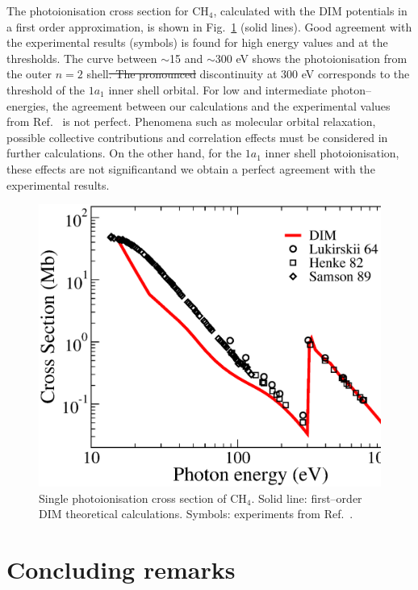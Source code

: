 \documentclass[10pt]{article}
\providecommand{\DIFaddtex}[1]{{\protect\color{blue}\uwave{#1}}} %
\providecommand{\DIFdeltex}[1]{{\protect\color{red}\sout{#1}}}                      %
\providecommand{\DIFaddbegin}{} %
\providecommand{\DIFaddend}{} %
\providecommand{\DIFdelbegin}{} %
\providecommand{\DIFdelend}{} %
\providecommand{\DIFadd}[1]{\texorpdfstring{\DIFaddtex{#1}}{#1}} %
\providecommand{\DIFdel}[1]{\texorpdfstring{\DIFdeltex{#1}}{}} %
\newcommand{\DIFscaledelfig}{0.5}
\newlength{\DIFdelgraphicswidth} %
\newlength{\DIFdelgraphicsheight} %
\newcommand{\DIFaddincludegraphics}[2][]{{\color{blue}\fbox{\DIFOincludegraphics[#1]{#2}}}} %
\newcommand{\DIFdelincludegraphics}[2][]{%
\sbox{\DIFdelgraphicsbox}{\DIFOincludegraphics[#1]{#2}}%
\settoboxwidth{\DIFdelgraphicswidth}{\DIFdelgraphicsbox} %
\settoboxtotalheight{\DIFdelgraphicsheight}{\DIFdelgraphicsbox} %
\scalebox{\DIFscaledelfig}{%
\parbox[b]{\DIFdelgraphicswidth}{\usebox{\DIFdelgraphicsbox}\\[-\baselineskip] \rule{\DIFdelgraphicswidth}{0em}}\llap{\resizebox{\DIFdelgraphicswidth}{\DIFdelgraphicsheight}{%
\setlength{\unitlength}{\DIFdelgraphicswidth}%
\begin{picture}(1,1)%
\thicklines\linethickness{2pt} %
{\color[rgb]{1,0,0}\put(0,0){\framebox(1,1){}}}%
{\color[rgb]{1,0,0}\put(0,0){\line( 1,1){1}}}%
{\color[rgb]{1,0,0}\put(0,1){\line(1,-1){1}}}%
\end{picture}%
}\hspace*{3pt}}} %
} %
\DeclareRobustCommand{\DIFaddbegin}{\DIFOaddbegin \let\includegraphics\DIFaddincludegraphics} %
\DeclareRobustCommand{\DIFaddend}{\DIFOaddend \let\includegraphics\DIFOincludegraphics} %
\DeclareRobustCommand{\DIFdelbegin}{\DIFOdelbegin \let\includegraphics\DIFdelincludegraphics} %
\DeclareRobustCommand{\DIFdelend}{\DIFOaddend \let\includegraphics\DIFOincludegraphics} %
\begin{document}
The photoionisation cross section for CH$_4$, calculated with the DIM 
potentials in a first order approximation, is shown in 
Fig.~\ref{fig:photoch4} (solid lines).
Good agreement with the experimental results (symbols) is found for 
high energy values and at the thresholds. The curve between $\sim$15 and
$\sim$300 eV shows the photoionisation from the outer $n=2$ shell\DIFdelbegin \DIFdel{. 
The pronounced }\DIFdelend \DIFaddbegin \DIFadd{, while 
the }\DIFaddend discontinuity at 300 eV corresponds to the threshold of
the $1a_1$ inner shell orbital. For low and intermediate photon--energies,
the agreement between our calculations and the experimental values 
from Ref.~\cite{Lukirskii1964,Henke1982,Samson1989} is not perfect.
Phenomena such as molecular orbital relaxation, possible 
collective contributions and correlation effects must be considered 
in further calculations. On the other hand, for the $1a_1$ inner shell
photoionisation, these effects are not significant\DIFaddbegin \DIFadd{, }\DIFaddend and we obtain a 
perfect agreement with the experimental results.
\begin{figure}[H]
\centering
\includegraphics[height=0.23\textheight]{figures/dimpot/photoch4.eps}
\caption{Single photoionisation cross section of CH$_4$.
Solid line: first--order DIM theoretical calculations. Symbols: experiments
from Ref.~\cite{Lukirskii1964,Henke1982,Samson1989}.}
\label{fig:photoch4}
\end{figure}


\section{Concluding remarks}
\end{document}

